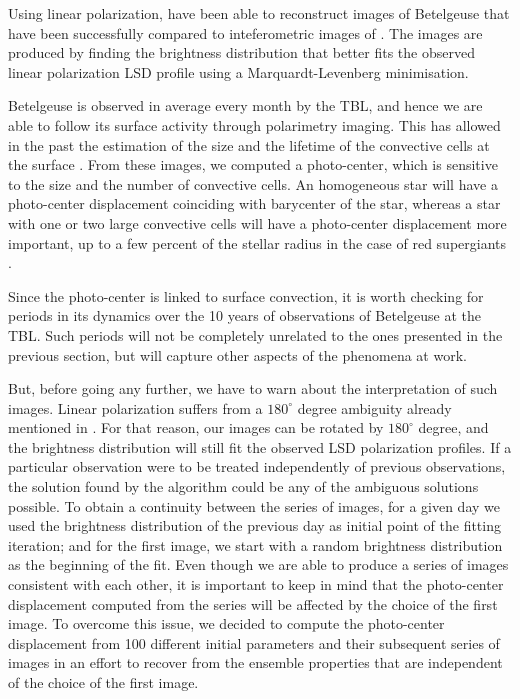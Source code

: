 \documentclass{aa}
\begin{document}
Using linear polarization, \cite{lopez_ariste_convective_2018} have been able to reconstruct images of Betelgeuse that have been successfully compared 
to inteferometric images of \cite{montarges_close_2016}. The images are produced by finding the brightness distribution that better fits the observed linear 
polarization LSD profile using a Marquardt-Levenberg minimisation.

Betelgeuse is observed in average every month by the TBL, and hence
we are able to follow its surface activity through polarimetry imaging. This has  allowed in the past the estimation of  the size and the
 lifetime of the convective cells
at the surface \citep{lopez_ariste_convective_2018}. From these images, we computed a photo-center, which is sensitive to the size and the number of convective cells. 
An homogeneous star will have a photo-center displacement coinciding with barycenter of the star, whereas a star with one or two large convective cells will have a
photo-center displacement more important, up to a few percent of the stellar radius in the case of red supergiants \citep{chiavassa_probing_2022}. 

Since the photo-center is linked to surface convection, it is worth checking for periods in its 
dynamics over the 10 years of observations of Betelgeuse at the TBL. Such periods will not 
be completely unrelated to the ones presented in the previous section, but will capture 
other aspects of the phenomena at work.

But, before going any further, we have to warn
 about the interpretation of such images. 
Linear polarization suffers from a $180 ^\circ$ degree ambiguity already mentioned in \cite{auriere_discovery_2016}. For that reason, our images 
can be 
rotated by $180^\circ$ degree, and the brightness distribution will still fit the observed LSD polarization profiles. 
If a particular observation were to be treated independently of previous observations, the solution found by 
the algorithm could be any of the ambiguous solutions possible. To obtain a continuity 
between the series of images, 
for a given day we used the brightness distribution of the previous day as initial point 
of the  fitting iteration; and for the first image, we start with a 
random brightness distribution as the beginning of the fit. 
Even though we are able to produce a series of images  consistent with each other, it is important 
to keep in mind that the photo-center displacement computed from the series 
will be affected by the choice of the first image. 
To overcome this issue, we decided to compute
the photo-center displacement from 100 different initial parameters and their subsequent series 
of images in an effort to recover from the ensemble
properties that are independent of the choice of the first image. 
\end{document}
